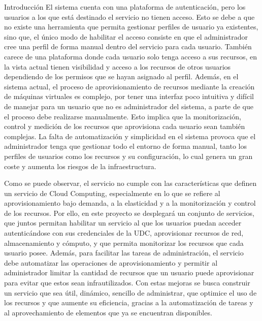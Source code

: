 \begin{chapter}{Introducción}
El sistema cuenta con una plataforma de autenticación, pero los usuarios a los que está destinado el servicio no tienen acceso. Esto se debe a que no existe una herramienta que permita gestionar perfiles de usuario ya existentes, sino que, el único modo de habilitar el acceso consiste en que el administrador cree una perfil de forma manual dentro del servicio para cada usuario. También carece de una plataforma donde cada usuario solo tenga acceso a sus recursos, en la vista actual tienen visibilidad y acceso a los recursos de otros usuarios dependiendo de los permisos que se hayan asignado al perfil. Además, en el sistema actual, el proceso de aprovisionamiento de recursos mediante la creación de máquinas virtuales es complejo, por tener una interfaz poco intuitiva y difícil de manejar para un usuario que no es administrador del sistema, a parte de que el proceso debe realizarse manualmente. Esto implica que la monitorización, control y medición de los recursos que aprovisiona cada usuario sean también complejas. La falta de automatización y simplicidad en el sistema provoca que el administrador tenga que gestionar todo el entorno de forma manual, tanto los perfiles de usuarios como los recursos y su configuración, lo cual genera un gran coste y aumenta los riesgos de la infraestructura.

Como se puede observar, el servicio no cumple con las características que definen un servicio de Cloud Computing, especialmente en lo que se refiere al aprovisionamiento bajo demanda, a la elasticidad y a la monitorización y control de los recursos. Por ello, en este proyecto se desplegará un conjunto de servicios, que juntos permitan habilitar un servicio al que los usuarios puedan acceder autenticándose con sus credenciales de la UDC, aprovisionar recursos de red, almacenamiento y cómputo, y que permita monitorizar los recursos que cada usuario posee. Además, para facilitar las tareas de administración, el servicio debe automatizar las operaciones de aprovisionamiento y permitir al administrador limitar la cantidad de recursos que un usuario puede aprovisionar para evitar que estos sean infrautilizados.
Con estas mejoras se busca construir un servicio que sea útil, dinámico, sencillo de administrar, que optimice el uso de los recursos y que aumente su eficiencia, gracias a la automatización de tareas y al aprovechamiento de elementos que ya se encuentran disponibles.


\end{chapter}
